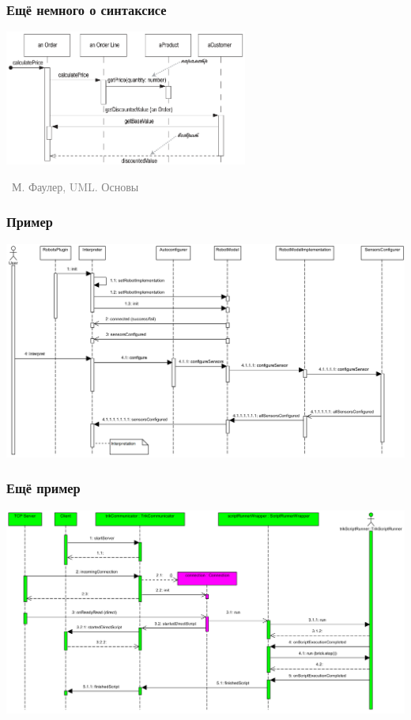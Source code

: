 \documentclass[xetex,mathserif,serif]{beamer}
\newcommand{\attribution}[1] {
	\vspace{-5mm}\begin{flushright}\begin{scriptsize}\textcolor{gray}{\textcopyright\, #1}\end{scriptsize}\end{flushright}
}
\begin{document}
	\begin{frame}
		\frametitle{Ещё немного о синтаксисе}
		\begin{center}
			\includegraphics[width=0.6\textwidth]{sequenceDiagramSyntax2.png}
			\attribution{М. Фаулер, UML. Основы}
		\end{center}
	\end{frame}

	\begin{frame}
		\frametitle{Пример}
		\begin{center}
			\includegraphics[width=\textwidth]{sequenceDiagramExample.png}
		\end{center}
	\end{frame}

	\begin{frame}
		\frametitle{Ещё пример}
		\begin{center}
			\includegraphics[width=\textwidth]{sequenceDiagramExample2.png}
		\end{center}
	\end{frame}
\end{document}
